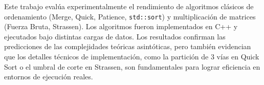 Este trabajo evalúa experimentalmente el rendimiento de algoritmos clásicos de ordenamiento (Merge, Quick, Patience, \texttt{std::sort}) y multiplicación de matrices (Fuerza Bruta, Strassen). Los algoritmos fueron implementados en C++ y ejecutados bajo distintas cargas de datos. Los resultados confirman las predicciones de las complejidades teóricas asintóticas, pero también evidencian que los detalles técnicos de implementación, como la partición de 3 vías en Quick Sort o el umbral de corte en Strassen, son fundamentales para lograr eficiencia en entornos de ejecución reales.